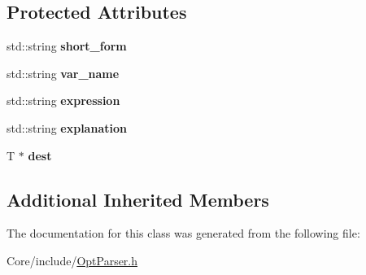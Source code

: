 \subsection*{Protected Attributes}
\begin{DoxyCompactItemize}
\item 
\hypertarget{classskl_1_1_opt_parser_atom_a5bc2ca7397229a0b0bed0134e8fa5b50}{}\label{classskl_1_1_opt_parser_atom_a5bc2ca7397229a0b0bed0134e8fa5b50} 
std\+::string {\bfseries short\+\_\+form}
\item 
\hypertarget{classskl_1_1_opt_parser_atom_a3113456fdb4df8a077e28993796d7291}{}\label{classskl_1_1_opt_parser_atom_a3113456fdb4df8a077e28993796d7291} 
std\+::string {\bfseries var\+\_\+name}
\item 
\hypertarget{classskl_1_1_opt_parser_atom_aa49aaaff1827f1085d24c246fa7f7c9b}{}\label{classskl_1_1_opt_parser_atom_aa49aaaff1827f1085d24c246fa7f7c9b} 
std\+::string {\bfseries expression}
\item 
\hypertarget{classskl_1_1_opt_parser_atom_aa741566483011d0be3d54653c4dde021}{}\label{classskl_1_1_opt_parser_atom_aa741566483011d0be3d54653c4dde021} 
std\+::string {\bfseries explanation}
\item 
\hypertarget{classskl_1_1_opt_parser_atom_af7a2921f7da6dd1981ce4ac791176448}{}\label{classskl_1_1_opt_parser_atom_af7a2921f7da6dd1981ce4ac791176448} 
T $\ast$ {\bfseries dest}
\end{DoxyCompactItemize}
\subsection*{Additional Inherited Members}


The documentation for this class was generated from the following file\+:\begin{DoxyCompactItemize}
\item 
Core/include/\hyperlink{_opt_parser_8h}{Opt\+Parser.\+h}\end{DoxyCompactItemize}
